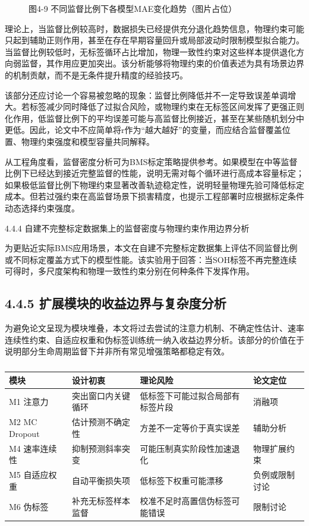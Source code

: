 \documentclass[12pt, a4paper]{ctexart}
\begin{document}
\begin{figure}[H]
  \centering
  \caption{图4-9  不同监督比例下各模型MAE变化趋势（图片占位）}
  \label{fig:}
\end{figure}

理论上，当监督比例较高时，数据损失已经提供充分退化趋势信息，物理约束可能只起到辅助正则作用，甚至在存在早期容量回升或局部波动时限制模型拟合能力。当监督比例较低时，无标签循环占比增加，物理一致性约束对这些样本提供退化方向弱监督，其作用应更加突出。该分析能够将物理约束的价值表述为具有场景边界的机制贡献，而不是无条件提升精度的经验技巧。


该部分还应讨论一个容易被忽略的现象：监督比例降低并不一定导致误差单调增大。若标签减少同时降低了过拟合风险，或物理约束在无标签区间发挥了更强正则化作用，低监督比例下的平均误差可能与高监督比例接近，甚至在某些随机划分中更低。因此，论文中不应简单将r作为“越大越好”的变量，而应结合监督覆盖位置、物理约束强度和模型容量共同解释。


从工程角度看，监督密度分析可为BMS标定策略提供参考。如果模型在中等监督比例下已经达到接近完整监督的性能，说明无需对每个循环进行高成本容量标定；如果极低监督比例下物理约束显著改善轨迹稳定性，说明轻量物理先验可降低标定成本。但若过强约束在高监督场景下损害精度，也提示工程部署时应根据标定条件动态选择约束强度。


4.4.4 自建不完整标定数据集上的监督密度与物理约束作用边界分析


为更贴近实际BMS应用场景，本文在自建不完整标定数据集上评估不同监督比例或不同标定覆盖方式下的模型性能。该实验用于回答：当SOH标签不再完整连续可得时，多尺度架构和物理一致性约束分别在何种条件下发挥作用。



\subsection{4.4.5 扩展模块的收益边界与复杂度分析}

为避免论文呈现为模块堆叠，本文将过去尝试的注意力机制、不确定性估计、速率连续性约束、自适应权重和伪标签训练统一纳入收益边界分析。该部分的价值在于说明部分生命周期监督下并非所有常见增强策略都稳定有效。




\begin{table}[H]
  \centering
  \begin{tabular}{llll}
  \toprule
  模块 & 设计初衷 & 理论风险 & 论文定位 \\
  \midrule
  M1 注意力 & 突出窗口内关键循环 & 低标签下可能过拟合局部有标签片段 & 消融项 \\
  M2 MC Dropout & 估计预测不确定性 & 方差不一定等价于真实误差 & 辅助分析 \\
  M4 速率连续性 & 抑制预测斜率突变 & 可能压制真实阶段性加速退化 & 物理扩展约束 \\
  M5 自适应权重 & 自动平衡损失项 & 低标签下权重可能漂移 & 负例或限制讨论 \\
  M6 伪标签 & 补充无标签样本监督 & 校准不足时高置信伪标签可能错误 & 限制讨论 \\
  \bottomrule
  \end{tabular}
  \caption{}
  \label{tab:}
\end{table}
\end{document}
